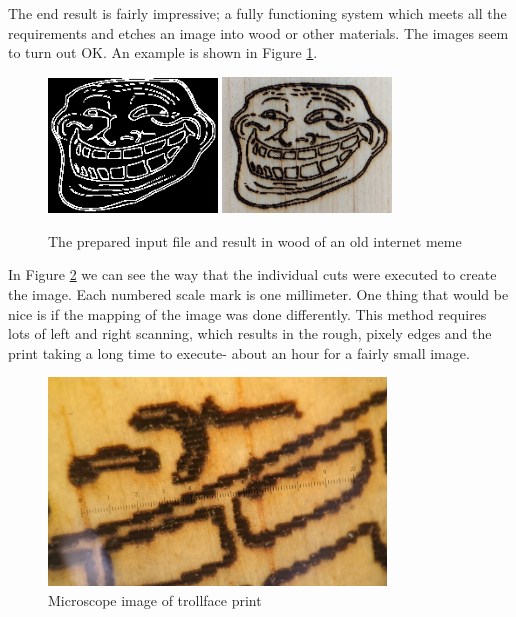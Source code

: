 \documentclass[11pt]{LaTeX-Classes/math-hw}
\begin{document}
The end result is fairly impressive; a fully functioning system which meets all the requirements
and etches an image into wood or other materials.
The images seem to turn out OK. An example is shown in Figure \ref{fig:troll-print}.
\begin{figure}[H]
  \begin{center}
    \includegraphics[width=0.4\textwidth]{trollface-edges}
    \includegraphics[width=0.4\textwidth]{trollface-result}
    \caption{The prepared input file and result in wood of an old internet meme}
    \label{fig:troll-print}
  \end{center}
\end{figure}

In Figure \ref{fig:burn-zoomed} we can see the way that the individual cuts were executed to
create the image.
Each numbered scale mark is one millimeter.
One thing that would be nice is if the mapping of the image was done differently.
This method requires lots of left and right scanning, which results in the rough, pixely edges
and the print taking a long time to execute- about an hour for a fairly small image.
\begin{figure}[H]
  \begin{center}
    \includegraphics[width=0.8\textwidth]{burn-zoomed}
    \caption{Microscope image of trollface print}
    \label{fig:burn-zoomed}
  \end{center}
\end{figure}
\end{document}
